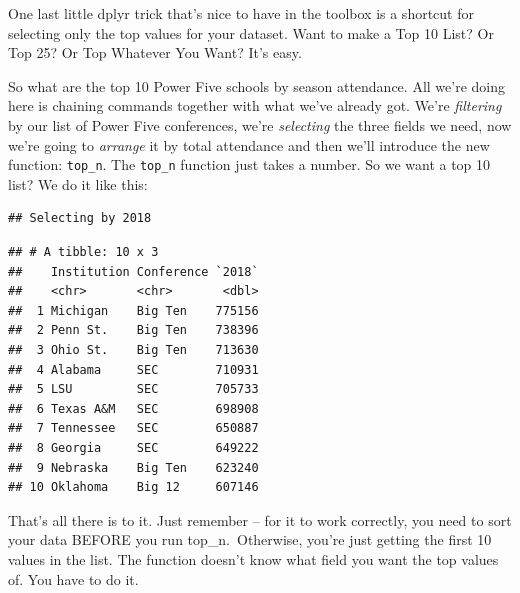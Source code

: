 \documentclass[
]{book}
\newenvironment{Shaded}{\begin{snugshade}}{\end{snugshade}}
\newcommand{\DataTypeTok}[1]{\textcolor[rgb]{0.13,0.29,0.53}{#1}}
\newcommand{\DecValTok}[1]{\textcolor[rgb]{0.00,0.00,0.81}{#1}}
\newcommand{\KeywordTok}[1]{\textcolor[rgb]{0.13,0.29,0.53}{\textbf{#1}}}
\newcommand{\NormalTok}[1]{#1}
\newcommand{\OperatorTok}[1]{\textcolor[rgb]{0.81,0.36,0.00}{\textbf{#1}}}
\newcommand{\StringTok}[1]{\textcolor[rgb]{0.31,0.60,0.02}{#1}}
\begin{document}
One last little dplyr trick that's nice to have in the toolbox is a shortcut for selecting only the top values for your dataset. Want to make a Top 10 List? Or Top 25? Or Top Whatever You Want? It's easy.

So what are the top 10 Power Five schools by season attendance. All we're doing here is chaining commands together with what we've already got. We're \emph{filtering} by our list of Power Five conferences, we're \emph{selecting} the three fields we need, now we're going to \emph{arrange} it by total attendance and then we'll introduce the new function: \texttt{top\_n}. The \texttt{top\_n} function just takes a number. So we want a top 10 list? We do it like this:

\begin{Shaded}
\end{Shaded}

\begin{verbatim}
## Selecting by 2018
\end{verbatim}

\begin{verbatim}
## # A tibble: 10 x 3
##    Institution Conference `2018`
##    <chr>       <chr>       <dbl>
##  1 Michigan    Big Ten    775156
##  2 Penn St.    Big Ten    738396
##  3 Ohio St.    Big Ten    713630
##  4 Alabama     SEC        710931
##  5 LSU         SEC        705733
##  6 Texas A&M   SEC        698908
##  7 Tennessee   SEC        650887
##  8 Georgia     SEC        649222
##  9 Nebraska    Big Ten    623240
## 10 Oklahoma    Big 12     607146
\end{verbatim}

That's all there is to it. Just remember -- for it to work correctly, you need to sort your data BEFORE you run top\_n.~Otherwise, you're just getting the first 10 values in the list. The function doesn't know what field you want the top values of. You have to do it.
\end{document}
